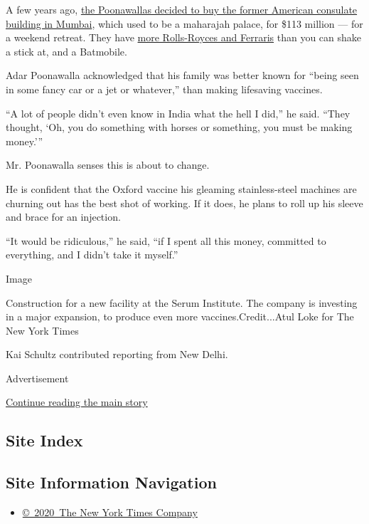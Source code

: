 A few years ago,
\href{https://www.cnbc.com/2015/09/14/cyrus-poonawalla-buys-mumbais-lincoln-house-setting-india-record.html}{the
Poonawallas decided to buy the former American consulate building in
Mumbai}, which used to be a maharajah palace, for \$113 million --- for
a weekend retreat. They have
\href{https://www.youtube.com/watch?v=Da0-uMocTMc}{more Rolls-Royces and
Ferraris} than you can shake a stick at, and a Batmobile.

Adar Poonawalla acknowledged that his family was better known for
``being seen in some fancy car or a jet or whatever,'' than making
lifesaving vaccines.

``A lot of people didn't even know in India what the hell I did,'' he
said. ``They thought, `Oh, you do something with horses or something,
you must be making money.'''

Mr. Poonawalla senses this is about to change.

He is confident that the Oxford vaccine his gleaming stainless-steel
machines are churning out has the best shot of working. If it does, he
plans to roll up his sleeve and brace for an injection.

``It would be ridiculous,'' he said, ``if I spent all this money,
committed to everything, and I didn't take it myself.''

Image

Construction for a new facility at the Serum Institute. The company is
investing in a major expansion, to produce even more
vaccines.Credit...Atul Loke for The New York Times

Kai Schultz contributed reporting from New Delhi.

Advertisement

\protect\hyperlink{after-bottom}{Continue reading the main story}

\hypertarget{site-index}{%
\subsection{Site Index}\label{site-index}}

\hypertarget{site-information-navigation}{%
\subsection{Site Information
Navigation}\label{site-information-navigation}}

\begin{itemize}
\tightlist
\item
  \href{https://help.nytimes.com/hc/en-us/articles/115014792127-Copyright-notice}{©~2020~The
  New York Times Company}
\end{itemize}

